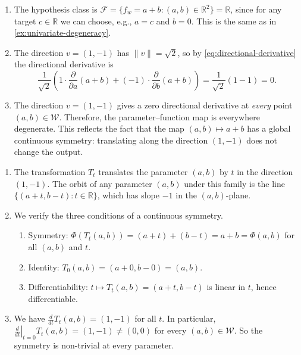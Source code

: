 \documentclass[11pt]{article}
\newcommand{\R}{\mathbb{R}}
\newcommand{\W}{\mathcal{W}}
\newcommand{\F}{\mathcal{F}}
\begin{document}
\begin{solution}
\begin{enumerate}
    \item The hypothesis class is $\F = \{f_w = a + b : (a, b) \in \R^2\} = \R$, since for any target $c \in \R$ we can choose, e.g., $a = c$ and $b = 0$. This is the same as in \cref{ex:univariate-degeneracy}.

    \item The direction $v = (1, -1)$ has $\|v\| = \sqrt{2}$, so by
    \eqref{eq:directional-derivative} the directional derivative is
    \begin{equation*}
        \frac{1}{\sqrt{2}}\left(
            1 \cdot \frac{\partial}{\partial a}(a + b)
            + (-1) \cdot \frac{\partial}{\partial b}(a + b)
        \right)
        = \frac{1}{\sqrt{2}}(1 - 1) = 0.
    \end{equation*}

    \item The direction $v = (1, -1)$ gives a zero directional derivative at \emph{every} point $(a, b) \in \W$. Therefore, the parameter--function map is everywhere degenerate. This reflects the fact that the map $(a, b) \mapsto a + b$ has a global continuous symmetry: translating along the direction $(1, -1)$ does not change the output. \qedhere
\end{enumerate}
\end{solution}

\begin{solution}
\begin{enumerate}
    \item The transformation $T_t$ translates the parameter $(a, b)$ by $t$ in the direction $(1, -1)$. The orbit of any parameter $(a, b)$ under this family is the line $\{(a + t, b - t) : t \in \R\}$, which has slope $-1$ in the $(a, b)$-plane.

    \item We verify the three conditions of a continuous symmetry.
    \begin{enumerate}[label=(\roman*)]
        \item Symmetry: $\Phi(T_t(a, b)) = (a + t) + (b - t) = a + b = \Phi(a, b)$ for all $(a, b)$ and $t$.
        \item Identity: $T_0(a, b) = (a + 0, b - 0) = (a, b)$.
        \item Differentiability: $t \mapsto T_t(a, b) = (a + t, b - t)$ is linear in $t$, hence differentiable.
    \end{enumerate}

    \item We have $\frac{d}{dt} T_t(a, b) = (1, -1)$ for all $t$. In particular, $\left.\frac{d}{dt}\right|_{t=0} T_t(a, b) = (1, -1) \neq (0, 0)$ for every $(a, b) \in \W$. So the symmetry is non-trivial at every parameter. \qedhere
\end{enumerate}
\end{solution}
\end{document}
